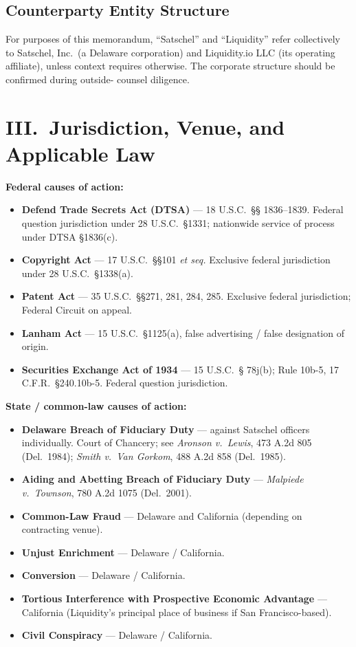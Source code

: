 \documentclass[11pt,letterpaper]{article}
\begin{document}
\subsection*{Counterparty Entity Structure}

For purposes of this memorandum, ``Satschel'' and ``Liquidity''
refer collectively to Satschel, Inc.\ (a Delaware corporation) and
Liquidity.io LLC (its operating affiliate), unless context requires
otherwise. The corporate structure should be confirmed during outside-
counsel diligence.

\section*{III.\ Jurisdiction, Venue, and Applicable Law}

\textbf{Federal causes of action:}

\begin{itemize}[leftmargin=1.5em,itemsep=0.1em]
\item \textbf{Defend Trade Secrets Act (DTSA)} --- 18 U.S.C.\ \S\S
1836--1839. Federal question jurisdiction under 28 U.S.C.\ \S 1331;
nationwide service of process under DTSA \S 1836(c).
\item \textbf{Copyright Act} --- 17 U.S.C.\ \S\S 101 \emph{et seq.}
Exclusive federal jurisdiction under 28 U.S.C.\ \S 1338(a).
\item \textbf{Patent Act} --- 35 U.S.C.\ \S\S 271, 281, 284, 285.
Exclusive federal jurisdiction; Federal Circuit on appeal.
\item \textbf{Lanham Act} --- 15 U.S.C.\ \S 1125(a), false advertising
/ false designation of origin.
\item \textbf{Securities Exchange Act of 1934} --- 15 U.S.C.\ \S
78j(b); Rule 10b-5, 17 C.F.R.\ \S 240.10b-5. Federal question
jurisdiction.
\end{itemize}

\textbf{State / common-law causes of action:}

\begin{itemize}[leftmargin=1.5em,itemsep=0.1em]
\item \textbf{Delaware Breach of Fiduciary Duty} --- against Satschel
officers individually. Court of Chancery; see \emph{Aronson v.\
Lewis}, 473 A.2d 805 (Del.\ 1984); \emph{Smith v.\ Van Gorkom}, 488
A.2d 858 (Del.\ 1985).
\item \textbf{Aiding and Abetting Breach of Fiduciary Duty} ---
\emph{Malpiede v.\ Townson}, 780 A.2d 1075 (Del.\ 2001).
\item \textbf{Common-Law Fraud} --- Delaware and California (depending
on contracting venue).
\item \textbf{Unjust Enrichment} --- Delaware / California.
\item \textbf{Conversion} --- Delaware / California.
\item \textbf{Tortious Interference with Prospective Economic
Advantage} --- California (Liquidity's principal place of business if
San Francisco-based).
\item \textbf{Civil Conspiracy} --- Delaware / California.
\end{itemize}
\end{document}
